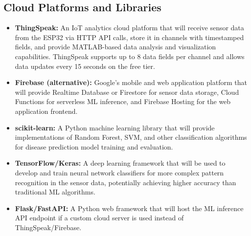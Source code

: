 \subsection{Cloud Platforms and Libraries}
\begin{itemize}[leftmargin=1.5cm]
\item \textbf{ThingSpeak:} An IoT analytics cloud platform that will receive sensor data from the ESP32 via HTTP API calls, store it in channels with timestamped fields, and provide MATLAB-based data analysis and visualization capabilities. ThingSpeak supports up to 8 data fields per channel and allows data updates every 15 seconds on the free tier.

\item \textbf{Firebase (alternative):} Google's mobile and web application platform that will provide Realtime Database or Firestore for sensor data storage, Cloud Functions for serverless ML inference, and Firebase Hosting for the web application frontend.

\item \textbf{scikit-learn:} A Python machine learning library that will provide implementations of Random Forest, SVM, and other classification algorithms for disease prediction model training and evaluation.

\item \textbf{TensorFlow/Keras:} A deep learning framework that will be used to develop and train neural network classifiers for more complex pattern recognition in the sensor data, potentially achieving higher accuracy than traditional ML algorithms.

\item \textbf{Flask/FastAPI:} A Python web framework that will host the ML inference API endpoint if a custom cloud server is used instead of ThingSpeak/Firebase.
\end{itemize}

